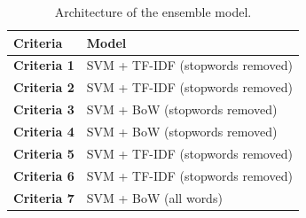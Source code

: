 \documentclass[a4paper,twoside,phd]{BYUPhys}
\begin{document}
\begin{table}[H]
	\centering
	\caption{Architecture of the ensemble model.}
	\begin{tabular}{|p{4.2cm}|p{5cm}|}
		\hline
		
		\textbf{Criteria} & \textbf{Model}                                                                                                                                                                                                                                                                                                                                                    \\
		\hline                                                                                                                                              
		
		\textbf{Criteria 1}  & SVM + TF-IDF (stopwords removed)  \\
		\hline
		
		\textbf{Criteria 2} & SVM + TF-IDF (stopwords removed)  \\
		\hline
		
		\textbf{Criteria 3} & SVM + BoW (stopwords removed) \\
		\hline
		
		\textbf{Criteria 4} & SVM + BoW (stopwords removed) \\
		\hline
		
		\textbf{Criteria 5}  & SVM + TF-IDF (stopwords removed)  \\
		\hline
		
		\textbf{Criteria 6} & SVM + TF-IDF (stopwords removed)  \\
		\hline
		
		\textbf{Criteria 7} & SVM + BoW (all words) \\
		\hline
		                                                   		
	\end{tabular}
	\label{table:EnsembleModel}
\end{table}
\end{document}
